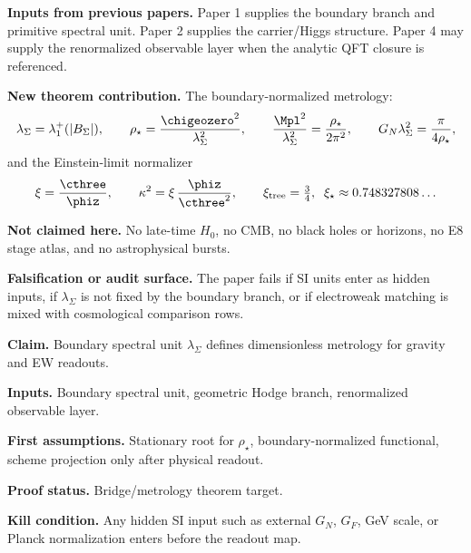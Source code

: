 
\maketitle

\begin{abstract}
This paper isolates the geometric and metrological branch of TFPT. The theory is not presented as
predicting isolated SI numbers. Instead it constructs an internal dimensionless metrology from the
boundary spectral unit $\lambda_\Sigma$, with gravity, Planck normalization, electroweak matching,
and pole readouts expressed as boundary-normalized observables.
\end{abstract}

\begin{tfptfrontbox}
\textbf{Inputs from previous papers.} Paper 1 supplies the boundary branch and primitive spectral
unit. Paper 2 supplies the carrier/Higgs structure. Paper 4 may supply the renormalized observable
layer when the analytic QFT closure is referenced.

\textbf{New theorem contribution.} The boundary-normalized metrology:
\[
\lambda_\Sigma=\lambda_1^+(|B_\Sigma|),\qquad
\rho_\star=\frac{\chigeozero^2}{\lambda_\Sigma^2},\qquad
\frac{\Mpl^2}{\lambda_\Sigma^2}=\frac{\rho_\star}{2\pi^2},\qquad
G_N\lambda_\Sigma^2=\frac{\pi}{4\rho_\star},
\]
and the Einstein-limit normalizer
\[
\xi=\frac{\cthree}{\phiz},
\qquad
\kappa^2=\xi\,\frac{\phiz}{\cthree^2},
\qquad
\xi_{\mathrm{tree}}=\tfrac{3}{4},\;\;
\xi_\star\approx 0.748327808\ldots
\]

\textbf{Not claimed here.} No late-time $H_0$, no CMB, no black holes or horizons, no E8 stage
atlas, and no astrophysical bursts.

\textbf{Falsification or audit surface.} The paper fails if SI units enter as hidden inputs, if
$\lambda_\Sigma$ is not fixed by the boundary branch, or if electroweak matching is mixed with
cosmological comparison rows.
\end{tfptfrontbox}


\begin{tfptclaimcontract}
\textbf{Claim.} Boundary spectral unit $\lambda_\Sigma$ defines dimensionless metrology for gravity and EW readouts.\par
\textbf{Inputs.} Boundary spectral unit, geometric Hodge branch, renormalized observable layer.\par
\textbf{First assumptions.} Stationary root for $\rho_\star$, boundary-normalized functional, scheme projection only after physical readout.\par
\textbf{Proof status.} Bridge/metrology theorem target.\par
\textbf{Kill condition.} Any hidden SI input such as external $G_N$, $G_F$, GeV scale, or Planck normalization enters before the readout map.\par
\end{tfptclaimcontract}

